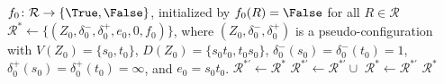 \documentclass[main.tex]{subfiles}
\begin{document}
\begin{algorithm}[H]
    \caption{\combineRulesWithLink($\mathcal{R}$, $\mathcal{K}$) - Lemma \ref{lem:vsends}, \ref{lem:vsends-noconf}}
    \label{alg:combine_rules}
    \begin{algorithmic}[1]
        \State $f_0 \colon \mathcal{R} \to \{\True, \False\}$, initialized by $f_0(R)=\False$ for all $R \in \mathcal{R}$
        \State $\mathcal{R}^* \gets \{(Z_0, \delta_0^-, \delta_0^+, e_0, 0, f_0)\}$, where $(Z_0, \delta_0^-, \delta_0^+)$ is a pseudo-configuration with $V(Z_0) = \{s_0,t_0\}$, $D(Z_0) = \{s_0t_0, t_0s_0\}$, $\delta_0^-(s_0)=\delta_0^-(t_0)=1$, $\delta_0^+(s_0)=\delta_0^+(t_0)=\infty$, and $e_0=s_0t_0$.
            \State $\mathcal{R}^{*'} \gets \mathcal{R}^*$
                \State $\mathcal{R}^{*'} \gets \mathcal{R}^{*'} \cup$ 
            \EndFor
            \State $\mathcal{R}^* \gets \mathcal{R}^{*'}$
        \EndFor
        \State \Return $\mathcal{R}^*$
    \end{algorithmic}
\end{algorithm}

\end{document}
